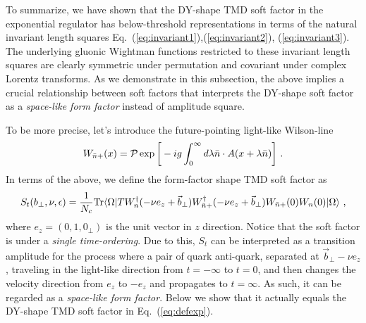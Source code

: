 \documentclass[a4paper,11pt]{article}
\begin{document}
To summarize, we have shown that the DY-shape TMD soft factor in the exponential regulator has below-threshold representations in terms of the natural invariant length squares Eq.~(\ref{eq:invariant1}),(\ref{eq:invariant2}), (\ref{eq:invariant3}). The underlying gluonic Wightman functions restricted to these invariant length squares are clearly symmetric under permutation and covariant under complex Lorentz transforms. As we demonstrate in this subsection, the above implies a crucial relationship between soft factors that interprets the DY-shape soft factor as a {\it space-like form factor} instead of amplitude square.

To be more precise, let's introduce the future-pointing light-like Wilson-line
\begin{align}\label{eq:minusfuture}
W_{\bar n+}(x)={\cal P}\exp \bigg[-ig\int_{0}^{\infty}d\lambda \bar n \cdot A(x+\lambda \bar n)\bigg] \ .
\end{align}
In terms of the above, we define the form-factor shape TMD soft factor as
\begin{align}\label{eq:defSt}
S_t(b_\perp,\nu,\epsilon)=\frac{1}{N_c}{\rm Tr}\langle \Omega|TW^{\dagger}_{n}(-\nu e_z+\vec{b}_\perp)W^{\dagger}_{\bar n+}(-\nu e_z+\vec{b}_\perp)W_{\bar n+}(0)W_n(0)|\Omega \rangle \ ,
\end{align}
where $e_z=(0,1,0_\perp)$ is the unit vector in $z$ direction. Notice that the soft factor is under a {\it single time-ordering}. Due to this, $S_t$ can be interpreted as a transition amplitude for the process where a pair of quark anti-quark, separated at $\vec{b}_\perp-\nu e_z$, traveling in the light-like direction from $t=-\infty$ to $t=0$, and then changes the velocity direction from $e_z$ to $-e_z$ and propagates to $t=\infty$. As such, it can be regarded as a {\it space-like form factor}. Below we show that it actually equals the DY-shape TMD soft factor in Eq.~(\ref{eq:defexp}).
\end{document}
